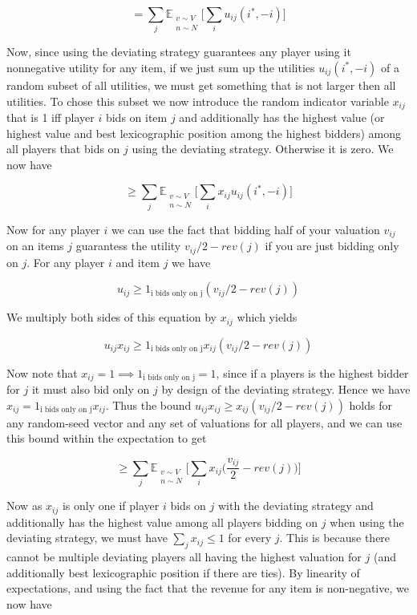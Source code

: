 $$
= \sum_j  \mathbb{E}_{ \substack{ v \sim V \\ n \sim N }} \bigg[ \sum_i   u_{ij}(i^*, -i)  \bigg]
$$


Now, since using the deviating strategy guarantees any player using it nonnegative utility for any item, if we just sum up the utilities $u_{ij}(i^*, -i)$ of a random subset of all utilities, we must get something that is not larger then all utilities. To chose this subset we now introduce the random indicator variable $x_{ij}$ that is 1 iff player $i$ bids on item $j$ and additionally has the highest value (or highest value and best lexicographic position among the highest bidders) among all players that bids on $j$ using the deviating strategy. Otherwise it is zero. We now have

$$
\ge \sum_j  \mathbb{E}_{ \substack{ v \sim V \\ n \sim N }} \bigg[ \sum_i  x_{ij} u_{ij}(i^*, -i)  \bigg]
$$

Now for any player $i$ we can use the fact that bidding half of your valuation $v_{ij}$ on an items $j$ guarantess the utility $v_{ij}/2 - rev(j)$ if you are just bidding only on $j$. For any player $i$ and item $j$ we have

$$
u_{ij} \ge 1_{\textrm{i bids only on j}} (v_{ij}/2 - rev(j))
$$

We multiply both sides of this equation by $x_{ij}$ which yields

$$
u_{ij} x_{ij} \ge 1_{\textrm{i bids only on j}} x_{ij} (v_{ij}/2 - rev(j))
$$

Now note that $x_{ij}=1 \implies 1_{\textrm{i bids only on j}} = 1$, since if a players is the highest bidder for $j$ it must also bid only on $j$ by design of the deviating strategy. Hence we have $x_{ij}= 1_{\textrm{i bids only on j}} x_{ij}$. Thus the bound $u_{ij} x_{ij} \ge x_{ij} (v_{ij}/2 - rev(j))$ holds for any random-seed vector and any set of valuations for all players, and we can use this bound within the expectation to get

$$
\ge \sum_j  \mathbb{E}_{ \substack{ v \sim V \\ n \sim N }} \bigg[ \sum_i  x_{ij} \bigg( \frac{v_{ij}}{2} - rev(j) \bigg) \bigg]
$$

Now as $x_{ij}$ is only one if player $i$ bids on $j$ with the deviating strategy and additionally has the highest value among all players bidding on $j$ when using the deviating strategy, we must have $\sum_{j} x_{ij} \le 1$ for every $j$. This is because there cannot be multiple deviating players all having the highest valuation for $j$ (and additionally best lexicographic position if there are ties). By linearity of expectations, and using the fact that the revenue for any item is non-negative, we now have

